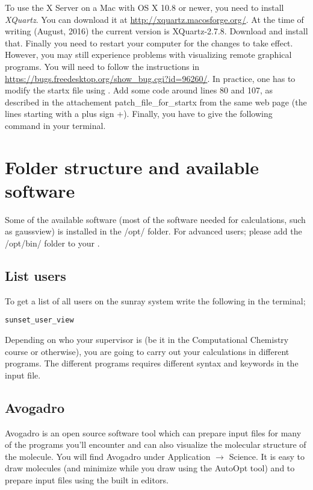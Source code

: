 \documentclass{article}
\begin{document}
To use the X Server on a Mac with OS X 10.8 or newer, you need to install \emph{XQuartz}.
You can download it at \url{http://xquartz.macosforge.org/}.
At the time of writing (August, 2016) the current version is XQuartz-2.7.8.
Download and install that.
Finally you need to restart your computer for the changes to take effect.
However, you may still experience problems with visualizing remote graphical programs.
You will need to follow the instructions in \url{https://bugs.freedesktop.org/show_bug.cgi?id=96260/}.
In practice, one has to modify the startx file using .
Add some code around lines 80 and 107, as described in the attachement patch\_file\_for\_startx from the same web page (the lines starting with a plus sign +).
Finally, you have to give the following command  in your terminal.


\newpage
\section{Folder structure and available software}

Some of the available software (most of the software needed for calculations, such as gaussview) is installed in the /opt/ folder.
For advanced users; please add the /opt/bin/ folder to your .\\

\subsection*{List users}

To get a list of all users on the sunray system write the following in the terminal;

\begin{lstlisting}
sunset_user_view
\end{lstlisting}


Depending on who your supervisor is (be it in the Computational Chemistry course or otherwise), you are going to carry out your calculations in different programs.
The different programs requires different syntax and keywords in the input file.\\

\subsection*{Avogadro}

Avogadro is an open source software tool which can prepare input files for many of the programs you'll encounter and can also visualize the molecular structure of the molecule.
You will find Avogadro under Application $\rightarrow$ Science.
It is easy to draw molecules (and minimize while you draw using the AutoOpt tool) and to prepare input files using the built in editors.
\end{document}
